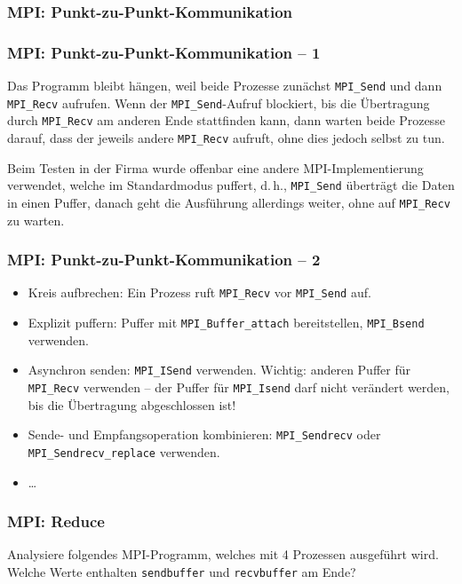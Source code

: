 \documentclass{beamer}
\begin{document}
\begin{frame}
  \frametitle{MPI: Punkt-zu-Punkt-Kommunikation}
  
\end{frame}

\begin{frame}
  \frametitle{MPI: Punkt-zu-Punkt-Kommunikation – 1}
  Das Programm bleibt hängen, weil beide Prozesse zunächst \lstinline{MPI_Send} und dann \lstinline{MPI_Recv} aufrufen.
  Wenn der \lstinline{MPI_Send}-Aufruf blockiert, bis die Übertragung durch \lstinline{MPI_Recv} am anderen Ende stattfinden kann,
  dann warten beide Prozesse darauf, dass der jeweils andere \lstinline{MPI_Recv} aufruft, ohne dies jedoch selbst zu tun.
  
  Beim Testen in der Firma wurde offenbar eine andere MPI-Implementierung verwendet,
  welche im Standardmodus puffert, d.\,h., \lstinline{MPI_Send} überträgt die Daten in einen Puffer,
  danach geht die Ausführung allerdings weiter, ohne auf \lstinline{MPI_Recv} zu warten.
\end{frame}

\begin{frame}
  \frametitle{MPI: Punkt-zu-Punkt-Kommunikation – 2}
  \begin{itemize}
  \item Kreis aufbrechen:
    Ein Prozess ruft \lstinline{MPI_Recv} vor \lstinline{MPI_Send} auf.
  \item Explizit puffern:
    Puffer mit \lstinline{MPI_Buffer_attach} bereitstellen,
    \lstinline{MPI_Bsend} verwenden.
  \item Asynchron senden:
    \lstinline{MPI_ISend} verwenden.
    Wichtig: anderen Puffer für \lstinline{MPI_Recv} verwenden –
    der Puffer für \lstinline{MPI_Isend} darf nicht verändert werden, bis die Übertragung abgeschlossen ist!
  \item Sende- und Empfangsoperation kombinieren:
    \lstinline{MPI_Sendrecv} oder \lstinline{MPI_Sendrecv_replace} verwenden.
  \item …
  \end{itemize}
\end{frame}

\begin{frame}
  \frametitle{MPI: Reduce}
  Analysiere folgendes MPI-Programm, welches mit 4 Prozessen ausgeführt wird.
  Welche Werte enthalten \lstinline{sendbuffer} und \lstinline{recvbuffer} am Ende?
  
\end{frame}
\end{document}
